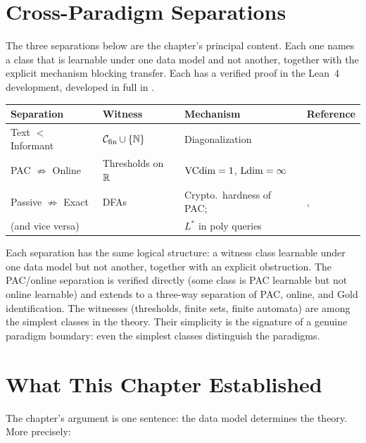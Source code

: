\section{Cross-Paradigm Separations}
\label{sec:data-separations}

The three separations below are the chapter's principal content. Each one names a class that is learnable under one data model and not another, together with the explicit mechanism blocking transfer. Each has a verified proof in the Lean~4 development, developed in full in .

\begin{center}\small
\begin{tabular}{llll}
\toprule
\textbf{Separation} & \textbf{Witness} & \textbf{Mechanism} & \textbf{Reference} \\
\midrule
Text $<$ Informant & $\mathcal{C}_{\mathrm{fin}} \cup \{\mathbb{N}\}$ & Diagonalization & \cite{Gold1967} \\[3pt]
PAC $\not\Rightarrow$ Online & Thresholds on $\mathbb{R}$ & $\mathrm{VCdim} = 1$, $\mathrm{Ldim} = \infty$ & \cite{Littlestone1988} \\[3pt]
Passive $\not\Rightarrow$ Exact & DFAs & Crypto.\ hardness of PAC; & \cite{Angluin1988}, \\
(and vice versa) & & $L^\ast$ in poly queries & \cite{KearnsValiant1994} \\
\bottomrule
\end{tabular}
\end{center}

Each separation has the same logical structure: a witness class learnable under one data model but not another, together with an explicit obstruction. The PAC/online separation is verified directly (some class is PAC learnable but not online learnable) and extends to a three-way separation of PAC, online, and Gold identification. The witnesses (thresholds, finite sets, finite automata) are among the simplest classes in the theory. Their simplicity is the signature of a genuine paradigm boundary: even the simplest classes distinguish the paradigms.

\section{What This Chapter Established}
\label{sec:ch2-summary}

The chapter's argument is one sentence: the data model determines the theory. More precisely:

